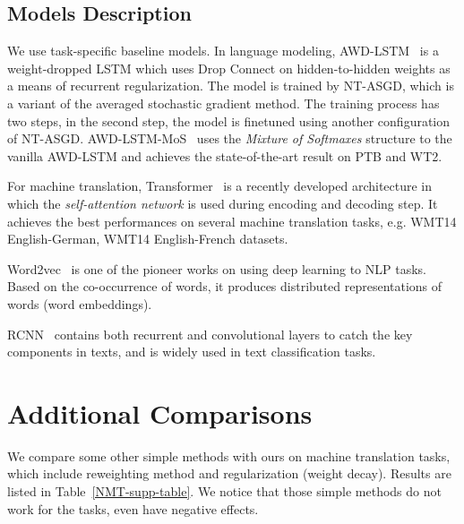 \documentclass{article}
\begin{document}
\subsection{Models Description}

We use task-specific baseline models. In language modeling, AWD-LSTM~\cite{DBLP:journals/corr/abs-1708-02182} is a weight-dropped LSTM which uses Drop Connect on hidden-to-hidden weights as a means of recurrent regularization. The model is trained by NT-ASGD, which is a variant of the averaged stochastic gradient method. The training process has two steps, in the second step, the model is finetuned using another configuration of NT-ASGD.
AWD-LSTM-MoS~\cite{DBLP:journals/corr/abs-1711-03953} uses the \emph{Mixture of Softmaxes} structure to the vanilla AWD-LSTM and achieves the state-of-the-art result on PTB and WT2.

For machine translation,  Transformer~\cite{vaswani2017attention}  is a recently developed architecture in which the \emph{self-attention network} is used during encoding and decoding step. It achieves the best performances on several machine translation tasks, e.g. WMT14 English-German, WMT14 English-French datasets.

Word2vec~\cite{mikolov2013distributed} is one of the pioneer works on using deep learning to NLP tasks. Based on the co-occurrence of words, it produces distributed representations of words (word embeddings).

RCNN~\cite{lai2015recurrent} contains both recurrent and convolutional layers to catch the key components in texts, and is widely used in text classification tasks.

\section{Additional Comparisons}
We compare some other simple methods with ours on machine translation tasks, which include reweighting method and  regularization (weight decay). Results are listed in Table~\ref{NMT-supp-table}. We notice that those simple methods do not work for the tasks, even have negative effects.
\end{document}
